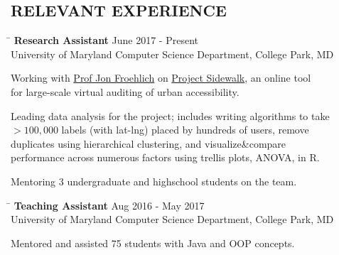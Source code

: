 \documentclass{res}
\begin{document}
\begin{resume}
{  \section{\hspace{0.3in}RELEVANT EXPERIENCE}
    \vspace{-3pt}
    \begin{tabbing}
      \hspace{5.65in}\=  \kill %
      {\bf Research Assistant}
      \>June 2017 - Present\\
      University of Maryland Computer Science Department, College Park, MD\\     
    \end{tabbing}
    \vspace{-24pt}      %
    \begin{list}{\bf{-}}{}
      \setlength{\itemsep}{-2pt}
      \item Working with \href{http://www.cs.umd.edu/~jonf/}{Prof Jon Froehlich} on
      \href{http://sidewalk.umiacs.umd.edu/}{Project Sidewalk}, an online tool\\ for large-scale
      virtual auditing of urban accessibility.
      \item Leading data analysis for the project; includes writing algorithms to take \\$>100,000$ labels (with lat-lng)
      placed by hundreds of users, remove \\duplicates using hierarchical clustering,
            and visualize\&compare \\performance across numerous factors using
            trellis plots, ANOVA, in R.
      \item Mentoring 3 undergraduate and highschool students on the team.
    \end{list}

    \vspace{-12pt}
    \begin{tabbing}
      \hspace{5.65in}\=  \kill %
      {\bf Teaching Assistant}
      \>Aug 2016 - May 2017\\
      University of Maryland Computer Science Department, College Park, MD\\     
    \end{tabbing}
    \vspace{-24pt}      %
    \begin{list}{\bf{-}}{}
      \setlength{\itemsep}{-2pt}
      \item Mentored and assisted 75 students with Java and OOP concepts.
    \end{list}
    
}
\end{resume}
\end{document}
